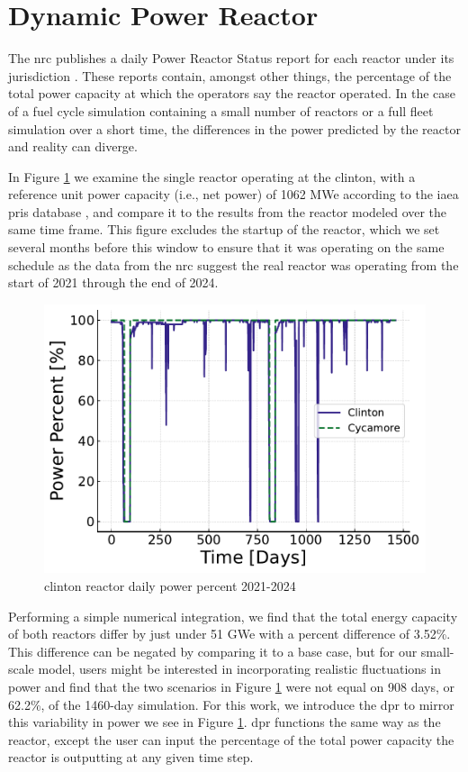 \section{Dynamic Power Reactor}
\label{sec:dpr_method}

The \gls{nrc} publishes a daily Power Reactor Status report for each reactor
under its jurisdiction \cite{nrc_power_2025}. These reports contain, amongst
other things, the percentage of the total power capacity at which the operators
say the reactor operated. In the case of a fuel cycle simulation containing a
small number of reactors or a full fleet simulation over a short time, the
differences in the power predicted by the \cycamore reactor and reality can
diverge.

In Figure \ref{fig:pp_full} we examine the single reactor operating at the
\gls{clinton}, with a reference unit power capacity (i.e., net power) of 1062
MWe according to the \gls{iaea} \gls{pris} database \cite{IAEA_PRIS}, and
compare it to the results from the \cycamore reactor modeled over the same time
frame. This figure excludes the startup of the \cycamore reactor, which we set
several months before this window to ensure that it was operating on the same
schedule as the data from the \gls{nrc} suggest the real reactor was operating
from the start of 2021 through the end of 2024.

\begin{figure}[H]
  \centering
  \includegraphics[width=0.7\linewidth]{images/power_reactor/power_percent_clinton_fake.pdf}
  \caption{\gls{clinton} reactor daily power percent 2021-2024}
  \label{fig:pp_full}
\end{figure}

Performing a simple numerical integration, we find that the total energy
capacity of both reactors differ by just under 51 GWe with a percent difference
of 3.52\%. This difference can be negated by comparing it to a base case, but
for our small-scale model, users might be interested in incorporating realistic
fluctuations in power and find that the two scenarios in Figure
\ref{fig:pp_full} were not equal on 908 days, or 62.2\%, of the 1460-day
simulation. For this work, we introduce the \gls{dpr} to mirror this
variability in power we see in Figure \ref{fig:pp_full}. \gls{dpr} functions
the same way as the \cycamore reactor, except the user can input the percentage
of the total power capacity the reactor is outputting at any given time step.


